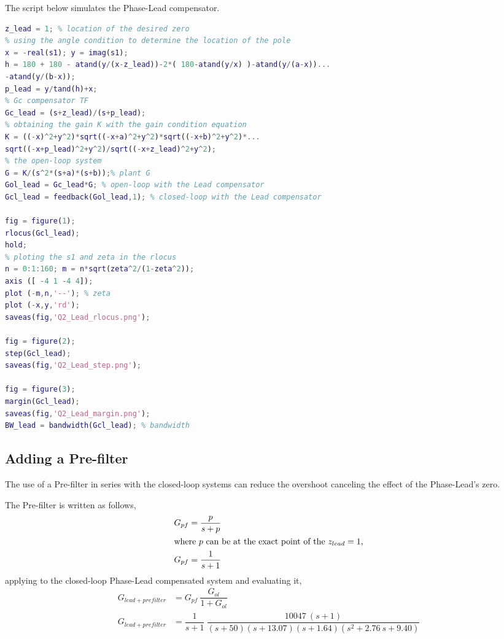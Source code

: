 \documentclass[11pt, a4paper]{article}
\begin{document}
The script below simulates the Phase-Lead compensator.
\begin{lstlisting}[language=matlab, caption={}, label={}]
%% c) Phase lead compensator
z_lead = 1; % location of the desired zero
% using the angle condition to determine the location of the pole
x = -real(s1); y = imag(s1);
h = 180 + 180 - atand(y/(x-z_lead))-2*( 180-atand(y/x) )-atand(y/(a-x))...
-atand(y/(b-x));
p_lead = y/tand(h)+x;
% Gc compensator TF
Gc_lead = (s+z_lead)/(s+p_lead);
% obtaining the gain K with the gain condition equation
K = ((-x)^2+y^2)*sqrt((-x+a)^2+y^2)*sqrt((-x+b)^2+y^2)*...
sqrt((-x+p_lead)^2+y^2)/sqrt((-x+z_lead)^2+y^2);
% the open-loop system
G = K/(s^2*(s+a)*(s+b));% plant G
Gol_lead = Gc_lead*G; % open-loop with the Lead compensator
Gcl_lead = feedback(Gol_lead,1); % closed-loop with the Lead compensator

fig = figure(1);
rlocus(Gcl_lead);
hold;
% ploting the s1 and zeta in the rlocus
n = 0:1:160; m = n*sqrt(zeta^2/(1-zeta^2));
axis ([ -4 1 -4 4]);
plot (-m,n,'--'); % zeta
plot (-x,y,'rd');
saveas(fig,'Q2_Lead_rlocus.png');

fig = figure(2);
step(Gcl_lead);
saveas(fig,'Q2_Lead_step.png');

fig = figure(3);
margin(Gcl_lead);
saveas(fig,'Q2_Lead_margin.png');
BW_lead = bandwidth(Gcl_lead); % bandwidth
\end{lstlisting}


\subsection{Adding a Pre-filter}
The use of a Pre-filter in series with the closed-loop systems can reduce the overshoot canceling the effect of the Phase-Lead's zero.

The Pre-filter is written as follows,
\begin{align}
G_{pf} &= \dfrac{p}{s+p} \\
\intertext{where $p$ can be at the exact point of the $z_{lead}=1$,}
G_{pf} &= \dfrac{1}{s+1} \nonumber
\end{align} 
applying to the closed-loop Phase-Lead compensated system and evaluating it,
\begin{align}
G_{lead+prefilter} &= G_{pf}~ \dfrac{G_{ol}}{1+G_{ol}} \nonumber\\
G_{lead+prefilter} &=  \dfrac{1}{s+1} ~\dfrac{10047~(s+1)}{(s+50)(s+13.07)(s+1.64)(s^2+2.76~s+9.40)}\nonumber
\end{align}  
\end{document}

